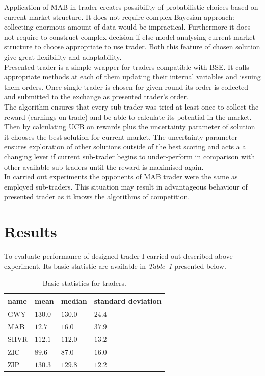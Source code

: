 \documentclass{llncs}
\begin{document}
Application of MAB in trader creates possibility of probabilistic choices based on current market structure. It does not require complex Bayesian approach: collecting enormous amount of data would be impractical. Furthermore it does not require to construct complex decision if-else model analysing current market structure to choose appropriate to use trader. Both this feature of chosen solution give great flexibility and adaptability.\\

Presented trader is a simple wrapper for traders compatible with BSE. It calls appropriate methods at each of them updating their internal variables and issuing them orders. Once single trader is chosen for given round its order is collected and submitted to the exchange as presented trader's order.\\
The algorithm ensures that every sub-trader was tried at least once to collect the reward (earnings on trade) and be able to calculate its potential in the market. Then by calculating UCB on rewards plus the uncertainty parameter of solution it chooses the best solution for current market. The uncertainty parameter ensures exploration of other solutions outside of the best scoring and acts a a changing lever if current sub-trader begins to under-perform in comparison with other available sub-traders until the reward is maximised again.\\

In carried out experiments the opponents of MAB trader were the same as employed sub-traders. This situation may result in advantageous behaviour of presented trader as it knows the algorithms of competition.

\section{Results}
To evaluate performance of designed trader I carried out described above experiment. Its basic statistic are available in \emph{Table~\ref{tab:stats}} presented below.\\

\begin{table}[ht]
  \centering
  \begin{tabular}{ p{5em} | p{5em}  p{5em}  p{5em} }
    name & mean & median & standard deviation \\
    \hline
    GWY  & $130.0$ &$ 130.0$ &$ 24.4$ \\
    MAB  & $12.7 $& $16.0 $& $37.9$ \\
    SHVR & $112.1$& $112.0 $& $13.2$\\
    ZIC  & $89.6 $& $87.0 $& $16.0$\\
    ZIP  & $130.3$ &$ 129.8$ & $12.2$
  \end{tabular}
  \vspace*{1em}
  \caption{Basic statistics for traders.\label{tab:stats}}
\end{table}
\end{document}
